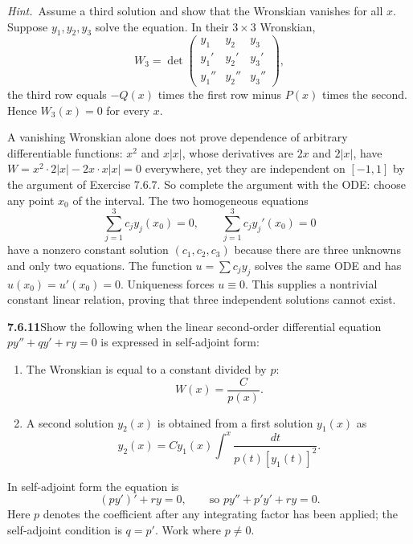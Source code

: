 \emph{Hint.}~Assume a third solution and show that the Wronskian vanishes for
all $x$.
\solution
{}
Suppose $y_1,y_2,y_3$ solve the equation. In their $3\times3$ Wronskian,
\[
W_3=\det\begin{pmatrix}y_1&y_2&y_3\\y_1'&y_2'&y_3'\\y_1''&y_2''&y_3''\end{pmatrix},
\]
the third row equals $-Q(x)$ times the first row minus $P(x)$ times
the second. Hence $W_3(x)=0$ for every $x$.

A vanishing Wronskian alone does not prove dependence of arbitrary
differentiable functions: $x^2$ and $x|x|$, whose derivatives are $2x$
and $2|x|$, have $W=x^2\cdot2|x|-2x\cdot x|x|=0$ everywhere, yet they are
independent on $[-1,1]$ by the argument of Exercise 7.6.7. So complete
the argument with the ODE: choose any point $x_0$ of the interval. The
two homogeneous equations
\[
\sum_{j=1}^3c_jy_j(x_0)=0,\qquad
\sum_{j=1}^3c_jy_j'(x_0)=0
\]
have a nonzero constant solution $(c_1,c_2,c_3)$ because there are
three unknowns and only two equations. The function
$u=\sum c_jy_j$ solves the same ODE and has $u(x_0)=u'(x_0)=0$.
Uniqueness forces $u\equiv0$. This supplies a nontrivial constant
linear relation, proving that three independent solutions cannot exist.

\par\bigskip
\noindent\textbf{7.6.11}\quad Show the following when the linear second-order
differential equation $py''+qy'+ry=0$ is expressed in self-adjoint form:
\begin{enumerate}
\item[(a)] The Wronskian is equal to a constant divided by $p$:
  \[
  W(x)=\frac{C}{p(x)}.
  \]
\item[(b)] A second solution $y_{2}(x)$ is obtained from a first solution
  $y_{1}(x)$ as
  \[
  y_{2}(x)=Cy_{1}(x)\int^{x}\frac{dt}{p(t)[y_{1}(t)]^{2}}.
  \]
\end{enumerate}
\solution
In self-adjoint form the equation is
\[
(py')'+ry=0,\qquad\text{so }py''+p'y'+ry=0.
\]
Here $p$ denotes the coefficient after any integrating factor has been
applied; the self-adjoint condition is $q=p'$. Work where $p\ne0$.

